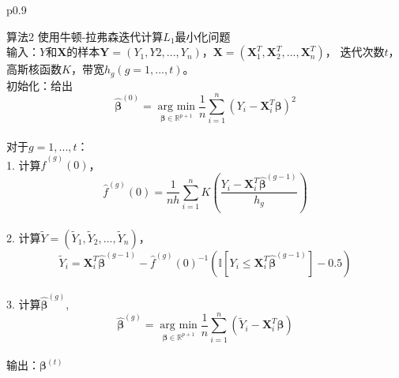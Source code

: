 \begin{table}[H]%
    \caption{\textbf{}}
    \centering%
    \begin{tabular}{{p{0.9\columnwidth}}}%
    
    \toprule%
    算法2 使用牛顿-拉弗森迭代计算$L_1$最小化问题\\
    \midrule%
    输入：$Y$和$\bm{X}$的样本$\bm{Y} = (Y_1, Y2, ..., Y_n)$，$\bm{X} = (\bm{X}^T_1, \bm{X}^T_2, ..., \bm{X}^T_n)$，
    迭代次数$t$，高斯核函数$K$，带宽$h_g(g = 1, ..., t)。$
    \\
    初始化：给出$$\hat{\bm{\beta}}^{(0)} = \underset{\bm{\beta} \in \mathbb{R}^{p+1}}{\operatorname{arg\ min}}
    \frac1{n}\sum_{i=1}^n (Y_i - \bm{X}_i^T\bm{\beta})^2$$
    \\
    对于$g = 1, ..., t$：
    \\
        1. 计算$\hat{f}^{(g)}(0)$，
        $$
        \hat{f}^{(g)}(0) = \frac1{nh}\sum_{i=1}^{n}K(\frac{Y_i - \bm{X}_i^T\hat{\bm{\beta}}^{(g-1)}}{h_g})
        $$
    \\
        2. 计算$\tilde{Y} = (\tilde Y_1, \tilde Y_2, ..., \tilde Y_n)$，
        $$
        \tilde{Y}_i = \bm{X}^T_i\hat{\bm{\beta}}^{(g-1)} - \hat{f}^{(g)}(0)^{-1}
        (\mathbb{I}[Y_i \leq \bm{X}_i^T \hat{\bm{\beta}}^{(g-1)}] - 0.5)
        $$
    \\
        3. 计算$\hat{\bm{\beta}}^{(g)}$,
        $$
        \hat{\bm{\beta}}^{(g)} = \underset{\bm{\beta} \in \mathbb{R}^{p+1}}{\operatorname{arg\ min}}
        \frac1{n}\sum_{i=1}^n (\tilde{Y}_i - \bm{X}_i^T\bm{\beta})
        $$
    \\
    输出：$\bm{\beta}^{(t)}$
    \\
    \bottomrule%
    \end{tabular}
\end{table}%